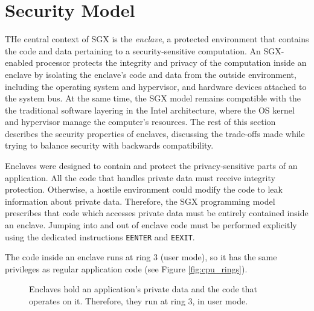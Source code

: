 \section{Security Model}
\label{sec:attestation}

THe central context of SGX is the \textit{enclave}, a protected environment
that contains the code and data pertaining to a security-sensitive computation.
An SGX-enabled processor protects the integrity and privacy of the computation
inside an enclave by isolating the enclave's code and data from the outside
environment, including the operating system and hypervisor, and hardware
devices attached to the system bus. At the same time, the SGX model remains
compatible with the the traditional software layering in the Intel
architecture, where the OS kernel and hypervisor manage the computer's
resources. The rest of this section describes the security properties of
enclaves, discussing the trade-offs made while trying to balance security with
backwards compatibility.



Enclaves were designed to contain and protect the privacy-sensitive parts of an
application. All the code that handles private data must receive integrity
protection. Otherwise, a hostile environment could modify the code to leak
information about private data. Therefore, the SGX programming model prescribes
that code which accesses private data must be entirely contained inside an
enclave. Jumping into and out of enclave code must be performed explicitly
using the dedicated instructions \texttt{EENTER} and \texttt{EEXIT}.

The code inside an enclave runs at ring 3 (user mode), so it has the same
privileges as regular application code (see Figure \ref{fig:cpu_rings}).

\begin{figure}[hbtp]
  \caption{
    Enclaves hold an application's private data and the code that operates on
    it. Therefore, they run at ring 3, in user mode.
  }
  \label{fig:computing_model}
\end{figure}
